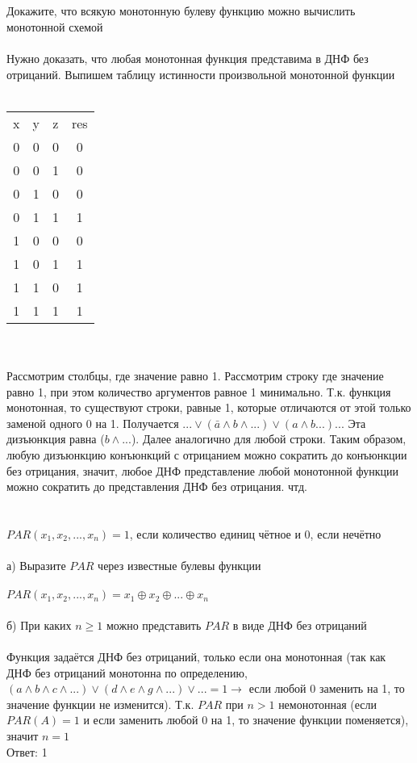 \documentclass{article}
\begin{document}
\section{}
Докажите, что всякую монотонную булеву функцию можно вычислить монотонной схемой\\\\
Нужно доказать, что любая монотонная функция представима в ДНФ без отрицаний.
Выпишем таблицу истинности произвольной монотонной функции\\\\
\begin{tabular}{ |c|c|c|c| } 
 \hline
 x & y & z & res \\
 0 & 0 & 0 & 0 \\ 
 0 & 0 & 1 & 0 \\ 
 0 & 1 & 0 & 0 \\ 
 0 & 1 & 1 & 1 \\
 1 & 0 & 0 & 0 \\ 
 1 & 0 & 1 & 1 \\
 1 & 1 & 0 & 1 \\ 
 1 & 1 & 1 & 1 \\ 
 \hline
 \end{tabular}\\\\
 Рассмотрим столбцы, где значение равно 1. Рассмотрим строку где значение равно 1, при этом количество аргументов равное 1 минимально. Т.к. функция монотонная, то существуют строки, равные 1, которые отличаются от этой только заменой одного 0 на 1. Получается $...\vee(\bar a \wedge b \wedge...) \vee (a \wedge b...)..$. Эта дизъюнкция равна 
 ($b \wedge...$). Далее аналогично для любой строки. Таким образом, любую дизъюнкцию конъюнкций с отрицанием можно сократить до конъюнкции без отрицания, значит, любое ДНФ представление любой монотонной функции можно сократить до представления ДНФ без отрицания. чтд.
\section{}
$PAR(x_1,x_2,...,x_n) = 1$, если количество единиц чётное и 0, если нечётно\\\\
а) Выразите $PAR$ через известные булевы функции\\\\
$PAR(x_1,x_2,...,x_n) = x_1 \oplus x_2 \oplus ... \oplus x_n$\\\\
б) При каких $n\geq 1$ можно представить $PAR$ в виде ДНФ без отрицаний\\\\
Функция задаётся ДНФ без отрицаний, только если она монотонная (так как ДНФ без отрицаний монотонна по определению, $(a\wedge b\wedge c\wedge...) \vee (d\wedge e\wedge g\wedge...) \vee... = 1 \rightarrow$ если любой 0 заменить на 1, то значение функции не изменится). Т.к. $PAR$ при $n>1$ немонотонная (если $PAR(A)=1$ и если заменить любой 0 на 1, то значение функции поменяется), значит $n=1$\\
Ответ: 1
\end{document}
